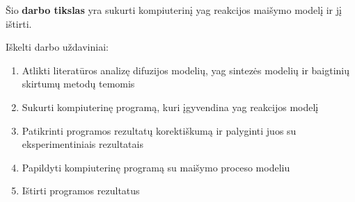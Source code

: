 


Šio \textbf{darbo tikslas} yra sukurti kompiuterinį \acs{yag} reakcijos maišymo modelį ir jį ištirti.

Iškelti darbo uždaviniai:

\begin{enumerate}
\item Atlikti literatūros analizę difuzijos modelių, \acs{yag} sintezės modelių ir baigtinių skirtumų metodų temomis
\item Sukurti kompiuterinę programą, kuri įgyvendina \acs{yag} reakcijos modelį
\item Patikrinti programos rezultatų korektiškumą ir palyginti juos su eksperimentiniais rezultatais
\item Papildyti kompiuterinę programą su maišymo proceso modeliu
\item Ištirti programos rezultatus
\end{enumerate}